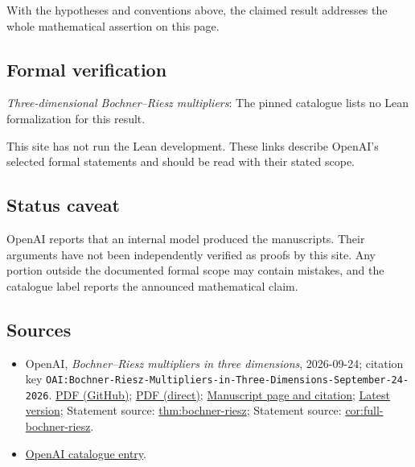 \documentclass[11pt]{article}
\begin{document}
With the hypotheses and conventions above, the claimed result addresses the whole mathematical assertion on this page.

\subsection{Formal verification}
\textit{Three-dimensional Bochner--Riesz multipliers}: The pinned catalogue lists no Lean formalization for this result.

This site has not run the Lean development. These links describe OpenAI’s selected formal statements and should be read with their stated scope.

\subsection{Status caveat}
OpenAI reports that an internal model produced the manuscripts. Their arguments have not been independently verified as proofs by this site. Any portion outside the documented formal scope may contain mistakes, and the catalogue label reports the announced mathematical claim.

\subsection{Sources}
\begin{itemize}
\item OpenAI, \emph{Bochner–Riesz multipliers in three dimensions}, 2026-09-24; citation key \texttt{OAI:Bochner-Riesz-Multipliers-in-Three-Dimensions-September-24-2026}. \href{https://github.com/openai/math/blob/adc7f1241b42e322a6451854ab7e4b4c146bf78a/preprints/Bochner-Riesz-Multipliers-in-Three-Dimensions-September-24-2026/Bochner-Riesz-Multipliers-in-Three-Dimensions-September-24-2026.pdf}{PDF (GitHub)}; \href{https://github.com/openai/math/raw/adc7f1241b42e322a6451854ab7e4b4c146bf78a/preprints/Bochner-Riesz-Multipliers-in-Three-Dimensions-September-24-2026/Bochner-Riesz-Multipliers-in-Three-Dimensions-September-24-2026.pdf}{PDF (direct)}; \href{https://github.com/openai/math/blob/adc7f1241b42e322a6451854ab7e4b4c146bf78a/preprints/Bochner-Riesz-Multipliers-in-Three-Dimensions-September-24-2026/README.md}{Manuscript page and citation}; \href{https://github.com/openai/math/blob/main/preprints/Bochner-Riesz-Multipliers-in-Three-Dimensions-September-24-2026/Bochner-Riesz-Multipliers-in-Three-Dimensions-September-24-2026.pdf}{Latest version}; Statement source: \href{https://github.com/openai/math/blob/adc7f1241b42e322a6451854ab7e4b4c146bf78a/preprints/Bochner-Riesz-Multipliers-in-Three-Dimensions-September-24-2026/build/sections/01-introduction.tex\#L21}{thm:bochner-riesz}; Statement source: \href{https://github.com/openai/math/blob/adc7f1241b42e322a6451854ab7e4b4c146bf78a/preprints/Bochner-Riesz-Multipliers-in-Three-Dimensions-September-24-2026/build/sections/12-multiplier.tex\#L437}{cor:full-bochner-riesz}.
\item \href{https://github.com/openai/math/blob/adc7f1241b42e322a6451854ab7e4b4c146bf78a/CONTENTS.md}{OpenAI catalogue entry}.
\end{itemize}
\end{document}

